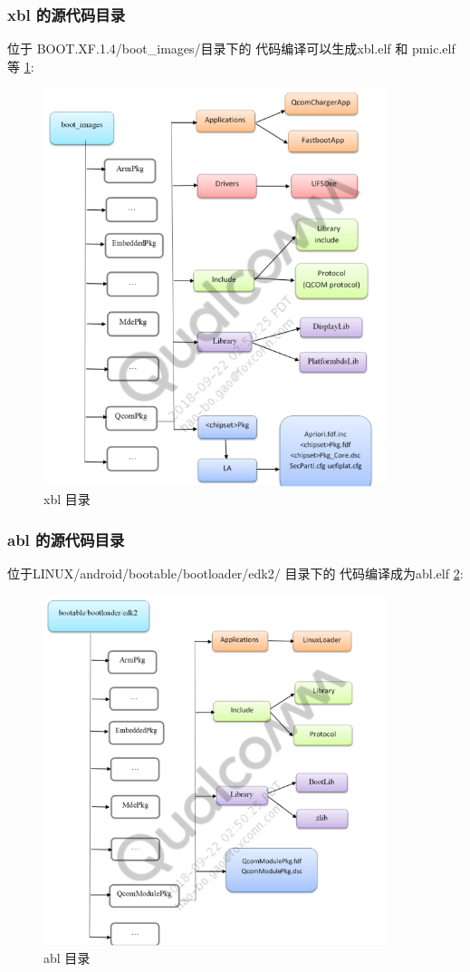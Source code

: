 \subsubsection{xbl 的源代码目录}
位于 BOOT.XF.1.4/boot\_images/目录下的 代码编译可以生成xbl.elf 和 pmic.elf 等 \ref{xbldir}:
\begin{figure}
\begin{center}
\includegraphics[width=10cm]{img/xbldir}
\caption{xbl 目录}
\label{xbldir}
\end{center}
\vspace{-0.5em}
\end{figure}


\subsubsection{abl 的源代码目录}
位于LINUX/android/bootable/bootloader/edk2/ 目录下的 代码编译成为abl.elf \ref{abldir}:
\begin{figure}
\begin{center}
\includegraphics[width=10cm]{img/abldir}
\caption{abl 目录}
\label{abldir}
\end{center}
\vspace{-0.5em}
\end{figure}


